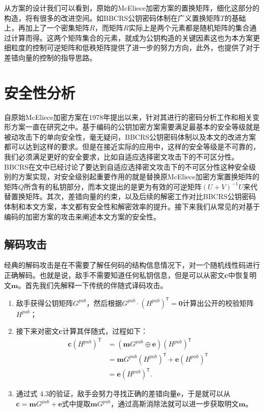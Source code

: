 从方案的设计我们可以看到，原始的McEliece加密方案的置换矩阵，细化这部分的构造，将有很多的改进空间。如BBCRS公钥密码体制在广义置换矩阵$T$的基础上，再加上了一个密集矩阵$R$，而矩阵$R$实际上是两个元素都是随机矩阵的集合通过计算而得。这两个矩阵集合的元素，就成为公钥构造的关键因素这也为本方案更细粒度的控制可逆矩阵和低秩矩阵提供了进一步的努力方向，此外，也提供了对于差错向量的控制的指导思路。

\section{安全性分析}
自原始McEliece加密方案在1978年提出以来，针对其进行的密码分析工作和相关变形方案一直在研究之中。基于编码的公钥加密方案需要满足最基本的安全等级就是被动攻击下的单向安全性，毫无疑问，BBCRS公钥密码体制以及本文的改进方案都可以达到这样的要求。但是在接近实际的应用中，这样的安全等级是不可靠的，我们必须满足更好的安全要求，比如自适应选择密文攻击下的不可区分性。BBCRS在文中已经讨论了要达到自适应选择密文攻击下的不可区分性这种安全级别的方案实现，对安全级别起重要作用的就是替换原McEliece加密方案置换矩阵的矩阵$Q$所含有的私钥部分，而本文提出的是更为有效的可逆矩阵$(U + V) ^ {-1}U$来代替置换矩阵。其次，差错向量的约束，以及后续的解密工作对比BBCRS公钥密码体制和本文方案，本文都有安全性和解密效率的提升。接下来我们从常见的对基于编码的加密方案的攻击来阐述本文方案的安全性。

\subsection{解码攻击}
经典的解码攻击是在不需要了解任何码的结构信息情况下，对一个随机线性码进行正确解码。也就是说，敌手不需要知道任何私钥信息，但是可以从密文$\mathbf{c}$中恢复明文$\mathbf{m}$。首先我们先解释一下传统的伴随式译码攻击。

\begin{enumerate}
	\item 敌手获得公钥矩阵$G^{pub}$，然后根据$G^{pub} \cdot (H^{pub})^\mathtt{T} = \mathbf{0}$计算出公开的校验矩阵$H^{pub}$；
	\item 接下来对密文$\mathbf{c}$计算其伴随式，过程如下：
	\begin{equation}
		\begin{aligned}
			\mathbf{c}(H^{pub})^\mathrm{T} & = (\mathbf{m}G^{pub} \oplus\mathbf{e})(H^{pub})^\mathtt{T} \\
			& = \mathbf{m}G^{pub}(H^{pub})^\mathtt{T} + \mathbf{e}(H^{pub})^\mathtt{T} \\
			& = \mathbf{e}(H^{pub})^\mathtt{T}.
		\end{aligned}
	\end{equation}
	\item 通过式 4.3的验证，敌手会努力寻找正确的差错向量$\mathbf{e}$，于是就可以从$\mathbf{c} = \mathbf{m}G^{pub} + \mathbf{e}$式中提取$\mathbf{m}G^{pub}$，通过高斯消除法就可以进一步获取明文$\mathbf{m}$。		
\end{enumerate}

